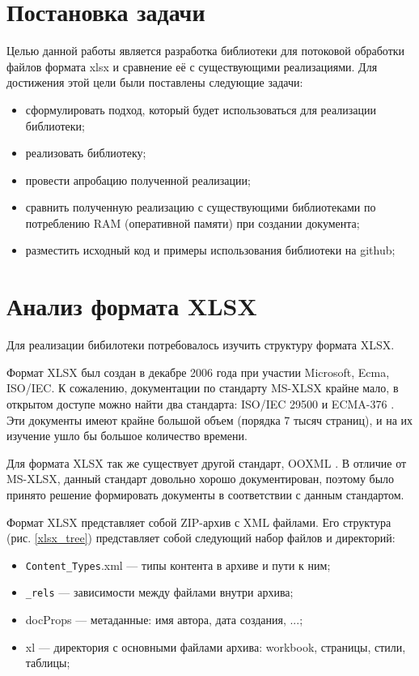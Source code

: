 \documentclass[14pt]{matmex-diploma}
\begin{document}
\section{Постановка задачи}
Целью данной работы является разработка библиотеки для потоковой обработки файлов формата xlsx и сравнение её с существующими реализациями.
Для достижения этой цели были поставлены следующие задачи:
\begin{itemize}
    \item сформулировать подход, который будет использоваться для реализации библиотеки;
    \item реализовать библиотеку;
    \item провести апробацию полученной реализации;
    \item сравнить полученную реализацию с существующими библиотеками по потреблению RAM (оперативной памяти) при создании документа;
    \item разместить исходный код и примеры использования библиотеки на github;
\end{itemize}

\section{Анализ формата XLSX}
Для реализации бибилотеки потребовалось изучить структуру формата XLSX.


Формат XLSX был создан в декабре 2006 года при участии Microsoft, Ecma, ISO/IEC. К сожалению, документации по стандарту MS-XLSX крайне мало, в открытом доступе можно найти два стандарта: ISO/IEC 29500 \cite{isostd} и ECMA-376 \cite{ecmastd}. Эти документы имеют крайне большой объем (порядка 7 тысяч страниц), и на их изучение ушло бы большое количество времени. 

Для формата XLSX так же существует другой стандарт, OOXML \cite{ooxml}. В отличие от MS-XLSX, данный стандарт довольно хорошо документирован, поэтому было принято решение формировать документы в соответствии с данным стандартом.

Формат XLSX представляет собой ZIP-архив с XML файлами. Его структура (рис. \ref{xlsx_tree}) представляет собой следующий набор файлов и директорий:
\begin{itemize}
    \item \texttt{Content\_Types}.xml --- типы контента в архиве и пути к ним;
    \item \texttt{\_rels} --- зависимости между файлами внутри архива;
    \item docProps --- метаданные: имя автора, дата создания, ...;
    \item xl --- директория с основными файлами архива: workbook, страницы, стили, таблицы;
\end{itemize}
\end{document}
